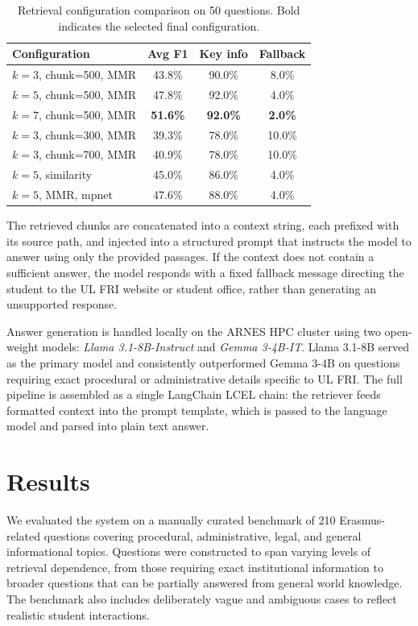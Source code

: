 \documentclass[fleqn,moreauthors,10pt]{ds_report}
\begin{document}
\begin{table}[h]
\centering
\small
\setlength{\tabcolsep}{5pt}
\begin{tabular}{lccc}
\hline
\textbf{Configuration} & \textbf{Avg F1} & \textbf{Key info} & \textbf{Fallback} \\
\hline
$k{=}3$, chunk=500, MMR  & 43.8\% & 90.0\% & 8.0\% \\
$k{=}5$, chunk=500, MMR  & 47.8\% & 92.0\% & 4.0\% \\
$k{=}7$, chunk=500, MMR  & \textbf{51.6\%} & \textbf{92.0\%} & \textbf{2.0\%} \\
$k{=}3$, chunk=300, MMR  & 39.3\% & 78.0\% & 10.0\% \\
$k{=}3$, chunk=700, MMR  & 40.9\% & 78.0\% & 10.0\% \\
$k{=}5$, similarity      & 45.0\% & 86.0\% &  4.0\% \\
$k{=}5$, MMR, mpnet      & 47.6\% & 88.0\% &  4.0\% \\
\hline
\end{tabular}
\caption{Retrieval configuration comparison on 50 questions.
Bold indicates the selected final configuration.}
\label{tab:tuning}
\end{table}

The retrieved chunks are concatenated into a context string, each
prefixed with its source path, and injected into a structured prompt
that instructs the model to answer using only the provided passages.
If the context does not contain a sufficient answer, the model responds
with a fixed fallback message directing the student to the UL FRI
website or student office, rather than generating an unsupported
response.

Answer generation is handled locally on the ARNES HPC cluster using
two open-weight models: \textit{Llama 3.1-8B-Instruct} and
\textit{Gemma 3-4B-IT}. Llama 3.1-8B served as the primary model and consistently outperformed
Gemma 3-4B on questions requiring exact procedural or administrative
details specific to UL FRI.
The full pipeline is assembled as a single LangChain LCEL chain: the
retriever feeds formatted context into the prompt template, which is
passed to the language model and parsed into plain text answer.



\section*{Results}
We evaluated the system on a manually curated benchmark of 210
Erasmus-related questions covering procedural, administrative, legal,
and general informational topics. Questions were constructed to span
varying levels of retrieval dependence, from those requiring exact
institutional information to broader questions that can be partially
answered from general world knowledge. The benchmark also includes
deliberately vague and ambiguous cases to reflect realistic student
interactions.
\end{document}
